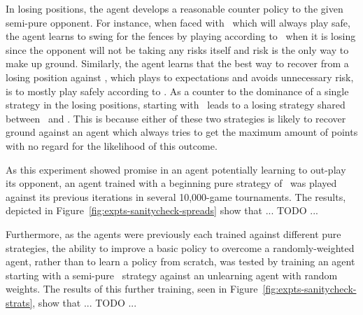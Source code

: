 In losing positions,
the agent develops a reasonable counter policy
to the given semi-pure opponent.
%
For instance,
when faced with \handmaxmin\ which will always play safe,
the agent learns to swing for the fences by playing according to \handmaxposs\ 
when it is losing
since the opponent will not be taking any risks itself
and risk is the only way to make up ground.
%
Similarly,
the agent learns that the best way to recover from a losing position
against \handmaxavg,
which plays to expectations and avoids unnecessary risk,
is to mostly play safely according to \handmaxmin.
%
As a counter to the dominance of a single strategy in the losing positions,
starting with \handmaxposs\ leads to a losing strategy
shared between \handmaxavg\ and \handmaxmed.
%
This is because either of these two strategies is likely to recover ground
against an agent which always tries to get the maximum amount of points
with no regard for the likelihood of this outcome.



As this experiment showed promise in an agent potentially learning
to out-play its opponent,
an agent trained with a beginning pure strategy of \handmaxavg\ was played
against its previous iterations in several 10,000-game tournaments.
%
The results,
depicted in Figure~\ref{fig:expts-sanitycheck-spreads}
show that ... TODO ...



Furthermore,
as the agents were previously each trained against different pure strategies,
the ability to improve a basic policy to overcome a randomly-weighted agent,
rather than to learn a policy from scratch,
was tested by training an agent starting with a semi-pure
\handmaxavg\ strategy against an unlearning agent with random weights.
%
The results of this further training,
seen in Figure~\ref{fig:expts-sanitycheck-strats},
show that ... TODO ...



